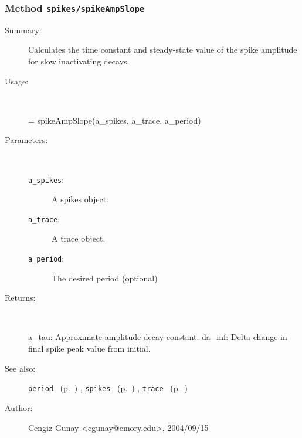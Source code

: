 \subsubsection[Method \texttt{spikeAmpSlope}]{Method \texttt{spikes/spikeAmpSlope}}%
%
\label{ref_spikes__spikeAmpSlope}%
\hypertarget{ref_spikes__spikeAmpSlope}{}%
\begin{description}
\item[Summary:]Calculates the time constant and steady-state value
		      of the spike amplitude for slow inactivating decays.
%
\item[Usage:]~%
\begin{lyxcode}%
[a\_tau, da\_inf] = spikeAmpSlope(a\_spikes, a\_trace, a\_period)
%
\end{lyxcode}%
%
%
\item[Parameters:]~
\begin{description}%
\item[\texttt{a\_spikes}:]
 A spikes object.
\item[\texttt{a\_trace}:]
 A trace object.
\item[\texttt{a\_period}:]
 The desired period (optional)
\end{description}%
%
\item[Returns:
]~

	a\_tau: Approximate amplitude decay constant.
	da\_inf: Delta change in final spike peak value from initial.
%
%
\item[See also:]%
\hyperlink{ref_period}{\texttt{period}}%
\ (p.~\pageref{ref_period})%
%
, \hyperlink{ref_spikes}{\texttt{spikes}}%
\ (p.~\pageref{ref_spikes})%
%
, \hyperlink{ref_trace}{\texttt{trace}}%
\ (p.~\pageref{ref_trace})%
%
%
\item[Author:]%
Cengiz Gunay <cgunay@emory.edu>, 2004/09/15
%
\end{description}
\methodline%
